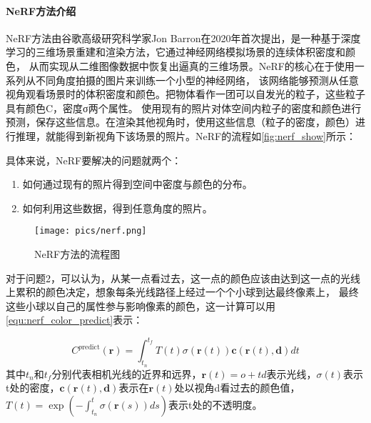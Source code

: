 \paragraph{NeRF方法介绍}
NeRF方法由谷歌高级研究科学家Jon Barron在2020年首次提出，是一种基于深度学习的三维场景重建和渲染方法，它通过神经网络模拟场景的连续体积密度和颜色，
从而实现从二维图像数据中恢复出逼真的三维场景。NeRF的核心在于使用一系列从不同角度拍摄的图片来训练一个小型的神经网络，
该网络能够预测从任意视角观看场景时的体积密度和颜色。把物体看作一团可以自发光的粒子，这些粒子具有颜色C，密度σ两个属性。
使用现有的照片对体空间内粒子的密度和颜色进行预测，保存这些信息。在渲染其他视角时，使用这些信息（粒子的密度，颜色）进行推理，就能得到新视角下该场景的照片。NeRF的流程如\autoref{fig:nerf_show}所示：
\par 具体来说，NeRF要解决的问题就两个：
\begin{enumerate}
    \item 如何通过现有的照片得到空间中密度与颜色的分布。
    \item 如何利用这些数据，得到任意角度的照片。
\end{enumerate}
\begin{figure}[htbp]
    \centering
    \texttt{[image: pics/nerf.png]}
    \caption{\label{fig:nerf_show}NeRF方法的流程图}
\end{figure}



对于问题2，可以认为，从某一点看过去，这一点的颜色应该由达到这一点的光线上累积的颜色决定，想象每条光线路径上经过一个个小球到达最终像素上，
最终这些小球以自己的属性参与影响像素的颜色，这一计算可以用\autoref{equ:nerf_color_predict}表示：

\begin{equation}
    \label{equ:nerf_color_predict}
    C^{p\text{redict}}(\mathbf{r})=\int_{t_n}^{t_f}T(t)\sigma(\mathbf{r}(t))\mathbf{c}(\mathbf{r}(t),\mathbf{d})dt
\end{equation}
其中$t_n$和$t_f$分别代表相机光线的近界和远界，$\mathbf{r}(t)=o+td$表示光线，$\sigma(t)$表示t处的密度，$\mathbf{c}(\mathbf{r}(t),\mathbf{d})$表示在$\mathbf{r}(t)$处以视角d看过去的颜色值，
$T(t)=\exp{(-\int_{t_n}^t\sigma(\mathbf{r}(s))ds)}$表示t处的不透明度。


